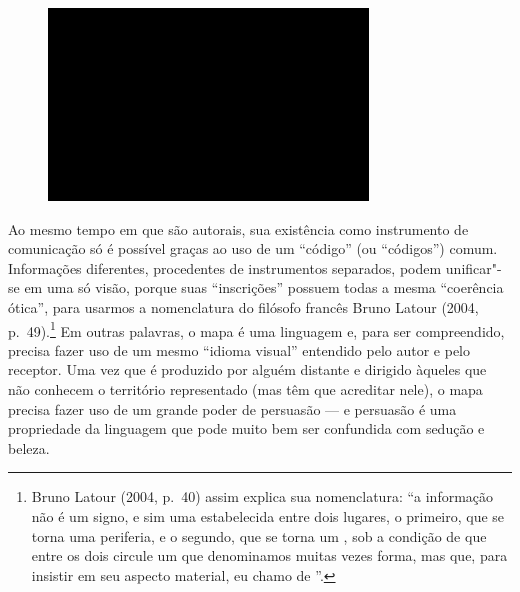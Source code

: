 \begin{figure}[!ht]
\centering
 \includegraphics[width=85mm]{./imgs/im1.jpg}
\caption{\tiny{}}
\end{figure}

Ao mesmo tempo em que são autorais, sua existência como instrumento de
comunicação só é possível graças ao uso de um ``código'' (ou
``códigos'') comum. Informações diferentes, procedentes de instrumentos
separados, podem unificar"-se em uma só visão, porque suas ``inscrições''
possuem todas a mesma ``coerência ótica'', para usarmos a nomenclatura
do filósofo francês Bruno Latour (2004, p.~49).\footnote{Bruno Latour
  (2004, p.~40) assim explica sua nomenclatura: ``a informação não é um
  signo, e sim uma {} estabelecida entre dois lugares, o
  primeiro, que se torna uma periferia, e o segundo, que se torna um
  {}, sob a condição de que entre os dois circule um
  {} que denominamos muitas vezes forma, mas que, para
  insistir em seu aspecto material, eu chamo de {}''.} Em
outras palavras, o mapa é uma linguagem e, para ser compreendido,
precisa fazer uso de um mesmo ``idioma visual'' entendido pelo autor e
pelo receptor. Uma vez que é produzido por alguém distante e dirigido
àqueles que não conhecem o território representado (mas têm que
acreditar nele), o mapa precisa fazer uso de um grande poder de
persuasão --- e persuasão é uma propriedade da linguagem que pode muito
bem ser confundida com sedução e beleza.

